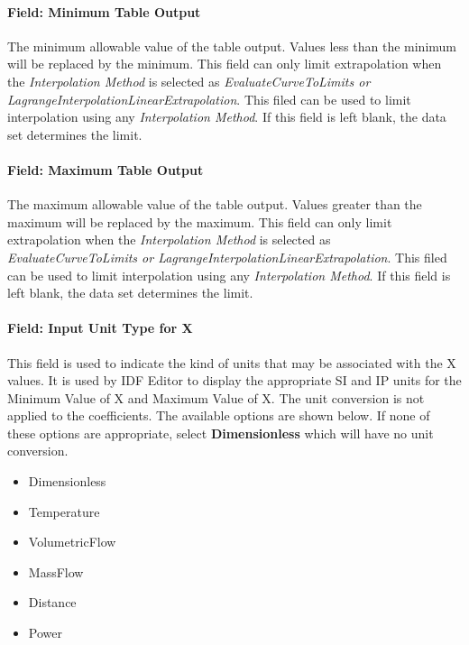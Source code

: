 \paragraph{Field: Minimum Table Output}\label{field-minimum-table-output-1}

The minimum allowable value of the table output. Values less than the minimum will be replaced by the minimum. This field can only limit extrapolation when the \emph{Interpolation Method} is selected as \emph{EvaluateCurveToLimits or LagrangeInterpolationLinearExtrapolation}. This filed can be used to limit interpolation using any \emph{Interpolation Method}. If this field is left blank, the data set determines the limit.

\paragraph{Field: Maximum Table Output}\label{field-maximum-table-output-1}

The maximum allowable value of the table output. Values greater than the maximum will be replaced by the maximum. This field can only limit extrapolation when the \emph{Interpolation Method} is selected as \emph{EvaluateCurveToLimits or LagrangeInterpolationLinearExtrapolation}. This filed can be used to limit interpolation using any \emph{Interpolation Method}. If this field is left blank, the data set determines the limit.

\paragraph{Field: Input Unit Type for X}\label{field-input-unit-type-for-x-000}

This field is used to indicate the kind of units that may be associated with the X values. It is used by IDF Editor to display the appropriate SI and IP units for the Minimum Value of X and Maximum Value of X. The unit conversion is not applied to the coefficients. The available options are shown below. If none of these options are appropriate, select \textbf{Dimensionless} which will have no unit conversion.

\begin{itemize}
\item
  Dimensionless
\item
  Temperature
\item
  VolumetricFlow
\item
  MassFlow
\item
  Distance
\item
  Power
\end{itemize}

